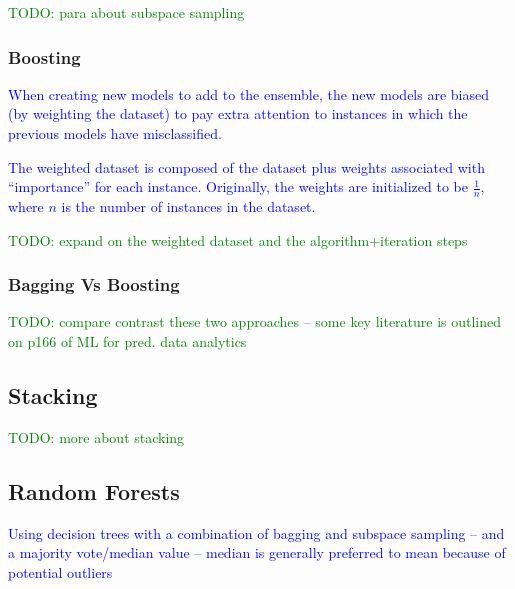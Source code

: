 \textcolor{green}{TODO: para about {subspace sampling}}

\subsubsection{Boosting}

\textcolor{blue}{When creating new models to add to the ensemble, the new models are biased (by weighting the dataset) to pay extra attention to instances in which the previous models have misclassified.}

\textcolor{blue}{The weighted dataset is composed of the dataset plus weights associated with ``importance'' for each instance. Originally, the weights are initialized to be $\frac{1}{n}$, where $n$ is the number of instances in the dataset.}

\textcolor{green}{TODO: expand on the weighted dataset and the algorithm+iteration steps}

\subsubsection{Bagging Vs Boosting}

\textcolor{green}{TODO: compare contrast these two approaches -- some key literature is outlined on p166 of ML for pred. data analytics}

\subsection{Stacking}

\textcolor{green}{TODO: more about stacking}

\subsection{Random Forests}

\textcolor{blue}{Using decision trees with a combination of bagging and subspace sampling -- and a majority vote/median value -- median is generally preferred to mean because of potential outliers}
